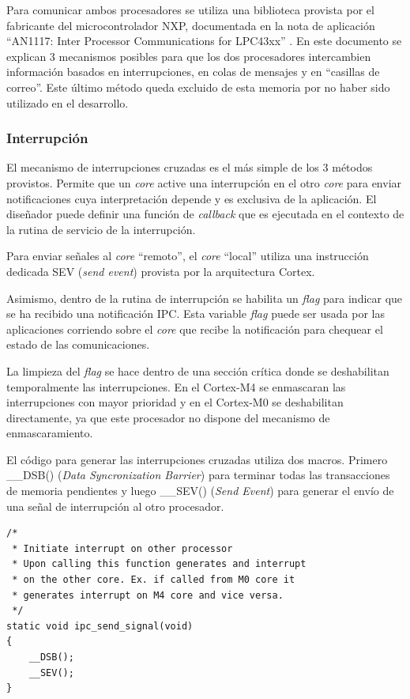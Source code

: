 Para comunicar ambos procesadores se utiliza una biblioteca provista por el fabricante del microcontrolador NXP, documentada en la nota de aplicación ``AN1117: Inter Processor Communications for LPC43xx'' \citep{nxp:an1117}. En este documento se explican 3 mecanismos posibles para que los dos procesadores intercambien información basados en interrupciones, en colas de mensajes y en ``casillas de correo''.  Este último método queda excluido de esta memoria por no haber sido utilizado en el desarrollo.

\subsubsection{Interrupción}
\label{subsubsec:interrupcion}

El mecanismo de interrupciones cruzadas es el más simple de los 3 métodos provistos.  Permite que un \textit{core} active una interrupción en el otro \textit{core} para enviar notificaciones cuya interpretación depende y es exclusiva de la aplicación.  El diseñador puede definir una función de \textit{callback} que es ejecutada en el contexto de la rutina de servicio de la interrupción.  

Para enviar señales al \textit{core} ``remoto'', el \textit{core} ``local'' utiliza una instrucción dedicada SEV (\textit{send event}) provista por la arquitectura Cortex.

Asimismo, dentro de la rutina de interrupción se habilita un \textit{flag} para indicar que se ha recibido una notificación IPC.  Esta variable \textit{flag} puede ser usada por las aplicaciones corriendo sobre el \textit{core} que recibe la notificación para chequear el estado de las comunicaciones. 

La limpieza del \textit{flag} se hace dentro de una sección crítica donde se deshabilitan temporalmente las interrupciones. En el Cortex-M4 se enmascaran las interrupciones con mayor prioridad y en el Cortex-M0 se deshabilitan directamente, ya que este procesador no dispone del mecanismo de enmascaramiento.

El código para generar las interrupciones cruzadas utiliza dos macros. Primero \_\_DSB() (\textit{Data Syncronization Barrier}) para terminar todas las transacciones de memoria pendientes y luego \_\_SEV() (\textit{Send Event}) para generar el envío de una señal de interrupción al otro procesador.
\begin{verbatim}
/*
 * Initiate interrupt on other processor
 * Upon calling this function generates and interrupt 
 * on the other core. Ex. if called from M0 core it 
 * generates interrupt on M4 core and vice versa.
 */
static void ipc_send_signal(void)
{
  	__DSB();
  	__SEV();
}
\end{verbatim}\label{cod:interrupt}  

